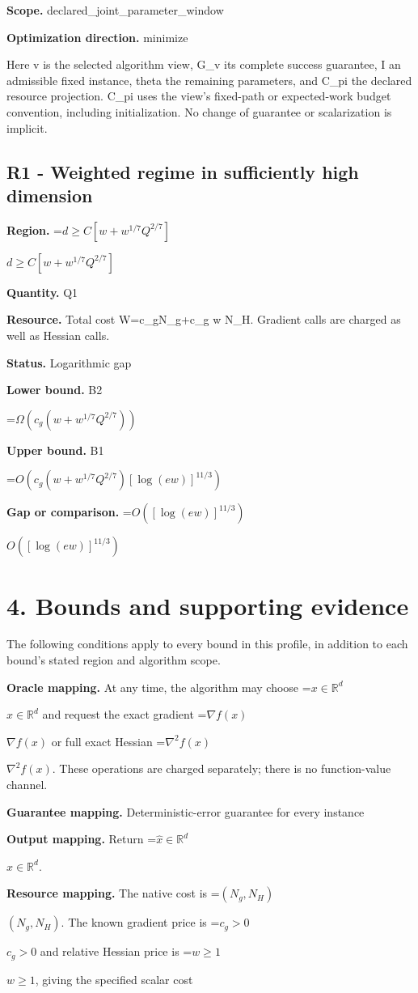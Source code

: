 \documentclass[10pt,a4paper]{article}
\newcommand{\AtlasMath}[1]{\par\begingroup\centering\setbox0=\hbox{$\displaystyle #1$}\ifdim\wd0>1.4\linewidth\typeout{ATLAS WIDE FORMULA: \the\wd0}\fi\ifdim\wd0>\linewidth\resizebox{\linewidth}{!}{\box0}\else\box0\fi\par\endgroup}
\newcommand{\AtlasInlineMath}[1]{\begingroup\setbox0=\hbox{$#1$}\ifdim\wd0>.4\linewidth\endgroup\AtlasMath{#1}\else\endgroup$#1$\fi}
\begin{document}
\textbf{Scope.} declared\_joint\_parameter\_window

\textbf{Optimization direction.} minimize

Here v is the selected algorithm view, G\_v its complete success guarantee, I an admissible fixed instance, theta the remaining parameters, and C\_pi the declared resource projection. C\_pi uses the view's fixed-path or expected-work budget convention, including initialization. No change of guarantee or scalarization is implicit.

\subsection{R1 - Weighted regime in sufficiently high dimension}
\textbf{Region.} \AtlasInlineMath{d\ge C[w+w^{1/7}Q^{2/7}]}

\textbf{Quantity.} Q1

\textbf{Resource.} Total cost W=c\_gN\_g+c\_g w N\_H. Gradient calls are charged as well as Hessian calls.

\textbf{Status.} Logarithmic gap

\textbf{Lower bound.} B2

\AtlasMath{\Omega(c_g(w+w^{1/7}Q^{2/7}))}
\textbf{Upper bound.} B1

\AtlasMath{O(c_g(w+w^{1/7}Q^{2/7})[\log(ew)]^{11/3})}
\textbf{Gap or comparison.} \AtlasInlineMath{O([\log(ew)]^{11/3})}

\section{4. Bounds and supporting evidence}
The following conditions apply to every bound in this profile, in addition to each bound's stated region and algorithm scope.

\textbf{Oracle mapping.} At any time, the algorithm may choose \AtlasInlineMath{x\in\mathbb{R}^d} and request the exact gradient \AtlasInlineMath{\nabla f(x)} or full exact Hessian \AtlasInlineMath{\nabla^2f(x)}. These operations are charged separately; there is no function-value channel.

\textbf{Guarantee mapping.} Deterministic-error guarantee for every instance

\textbf{Output mapping.} Return \AtlasInlineMath{\widehat{x}\in \mathbb{R}^d}.

\textbf{Resource mapping.} The native cost is \AtlasInlineMath{(N_g,N_H)}. The known gradient price is \AtlasInlineMath{c_g>0} and relative Hessian price is \AtlasInlineMath{w\ge1}, giving the specified scalar cost
\end{document}
